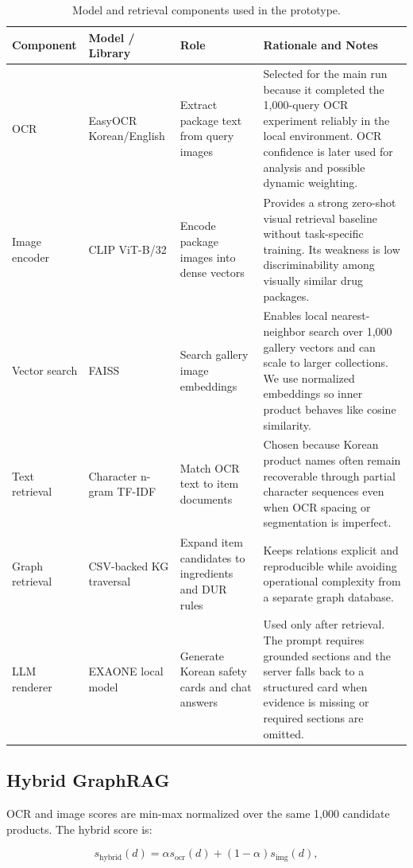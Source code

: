 \documentclass[sigconf,screen,nonacm]{acmart}
\begin{document}
\begin{table}[t]
\centering
\caption{Model and retrieval components used in the prototype.}
\label{tab:model-components}
\begin{tabular}{p{}p{}p{}p{}}
\toprule
Component & Model / Library & Role & Rationale and Notes \\
\midrule
OCR & EasyOCR Korean/English & Extract package text from query images & Selected for the main run because it completed the 1,000-query OCR experiment reliably in the local environment. OCR confidence is later used for analysis and possible dynamic weighting. \\
Image encoder & CLIP ViT-B/32 & Encode package images into dense vectors & Provides a strong zero-shot visual retrieval baseline without task-specific training. Its weakness is low discriminability among visually similar drug packages. \\
Vector search & FAISS & Search gallery image embeddings & Enables local nearest-neighbor search over 1,000 gallery vectors and can scale to larger collections. We use normalized embeddings so inner product behaves like cosine similarity. \\
Text retrieval & Character n-gram TF-IDF & Match OCR text to item documents & Chosen because Korean product names often remain recoverable through partial character sequences even when OCR spacing or segmentation is imperfect. \\
Graph retrieval & CSV-backed KG traversal & Expand item candidates to ingredients and DUR rules & Keeps relations explicit and reproducible while avoiding operational complexity from a separate graph database. \\
LLM renderer & EXAONE local model & Generate Korean safety cards and chat answers & Used only after retrieval. The prompt requires grounded sections and the server falls back to a structured card when evidence is missing or required sections are omitted. \\
\bottomrule
\end{tabular}
\end{table}

\subsection{Hybrid GraphRAG}
OCR and image scores are min-max normalized over the same 1,000 candidate products. The hybrid score is:

\begin{equation}
s_{\mathrm{hybrid}}(d) = \alpha s_{\mathrm{ocr}}(d) + (1-\alpha)s_{\mathrm{img}}(d),
\end{equation}
\end{document}
